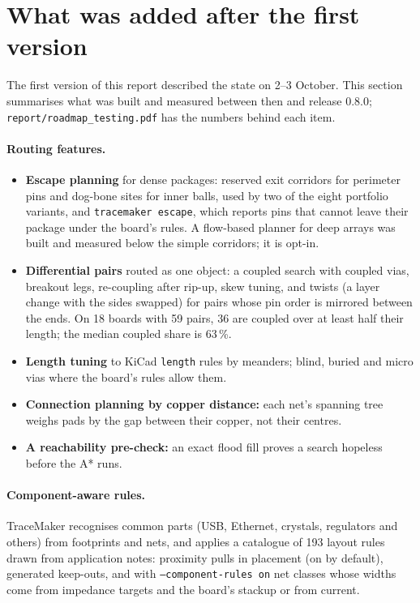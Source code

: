 \documentclass[10pt,a4paper]{article}
\begin{document}
\section{What was added after the first version}
\label{sec:since}

The first version of this report described the state on 2--3 October. This section summarises what was built and
measured between then and release 0.8.0; \texttt{report/roadmap\_testing.pdf} has the numbers behind each item.

\paragraph{Routing features.}
\begin{itemize}[leftmargin=*]
  \item \textbf{Escape planning} for dense packages: reserved exit corridors for perimeter pins and dog-bone sites
  for inner balls, used by two of the eight portfolio variants, and \texttt{tracemaker escape}, which reports pins
  that cannot leave their package under the board's rules. A flow-based planner for deep arrays was built and
  measured below the simple corridors; it is opt-in.
  \item \textbf{Differential pairs} routed as one object: a coupled search with coupled vias, breakout legs,
  re-coupling after rip-up, skew tuning, and twists (a layer change with the sides swapped) for pairs whose pin
  order is mirrored between the ends. On 18 boards with 59 pairs, 36 are coupled over at least half their length;
  the median coupled share is 63\,\%.
  \item \textbf{Length tuning} to KiCad \texttt{length} rules by meanders; blind, buried and micro vias where the
  board's rules allow them.
  \item \textbf{Connection planning by copper distance:} each net's spanning tree weighs pads by the gap between
  their copper, not their centres.
  \item \textbf{A reachability pre-check:} an exact flood fill proves a search hopeless before the A* runs.
\end{itemize}

\paragraph{Component-aware rules.} TraceMaker recognises common parts (USB, Ethernet, crystals, regulators and
others) from footprints and nets, and applies a catalogue of 193 layout rules drawn from application notes:
proximity pulls in placement (on by default), generated keep-outs, and with \texttt{--component-rules on} net
classes whose widths come from impedance targets and the board's stackup or from current.
\end{document}
